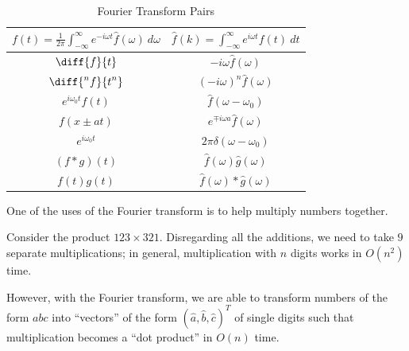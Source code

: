 \documentclass[10pt]{mypackage}
\begin{document}
\begin{table}[t]
  \centering
  \renewcommand{\arraystretch}{2}
  \begin{tabular}{c|c}
    $ f(t) = \frac{1}{2\pi} \int_{-\infty}^{\infty} e^{-i\omega t}\hat{f}(\omega)\:d\omega$ & $ \hat{f}(k) = \int_{-\infty}^{\infty} e^{i\omega t}f(t)\:dt$\\
    \hline\hline
    $\displaystyle \diff{f}{t}$ & $\displaystyle -i\omega \hat{f}\left( \omega \right)$\\
    $\displaystyle \diff{^{n}f}{t^{n}}$ & $\displaystyle \left( -i\omega \right)^{n} \hat{f}\left( \omega \right)$\\
    $\displaystyle e^{i\omega_0 t}f(t)$ & $\displaystyle \hat{f}\left( \omega-\omega_0 \right)$\\
    $\displaystyle f\left( x \pm at \right)$ & $\displaystyle e^{\mp i\omega a}\hat{f}\left( \omega \right)$\\
    $\displaystyle e^{i\omega_0 t}$ & $\displaystyle 2\pi\delta\left( \omega-\omega_0 \right)$\\
    \hline
    $\left( f\ast g \right)(t)$ & $\hat{f}\left( \omega \right)\hat{g}\left( \omega \right)$\\
    $f(t)g(t)$ & $\hat{f}\left(\omega\right)\ast \hat{g}\left(\omega\right)$
  \end{tabular}
  \caption{Fourier Transform Pairs}
\end{table}
One of the uses of the Fourier transform is to help multiply numbers together.\newline

Consider the product $123\times 321$. Disregarding all the additions, we need to take $9$ separate multiplications; in general, multiplication with $n$ digits works in $O\left(n^2\right)$ time.\newline

However, with the Fourier transform, we are able to transform numbers of the form $abc$ into ``vectors'' of the form $ (\hat{a},\hat{b},\hat{c})^{T} $ of single digits such that multiplication becomes a ``dot product'' in $O(n)$ time.\newline
\end{document}
